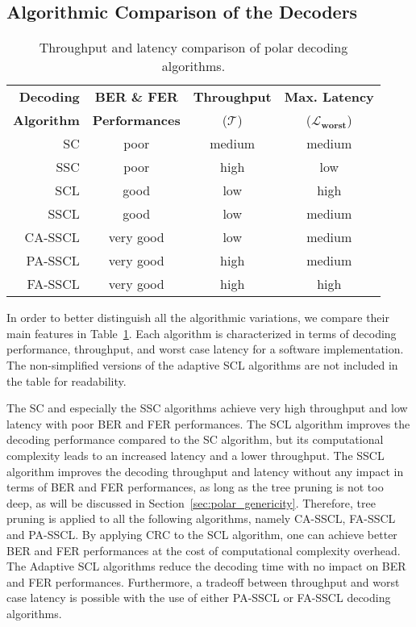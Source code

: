 \subsection{Algorithmic Comparison of the Decoders}

\begin{table}[htp]
  \centering
  \caption{Throughput and latency comparison of polar decoding algorithms.}
  \label{tab:polar_algos}
   \begin{tabular}{r c c c}
    \textbf{Decoding}  & \textbf{BER \& FER}   & \multirow{1}{*}{\textbf{Throughput}} & \textbf{Max. Latency}        \\
    \textbf{Algorithm} & \textbf{Performances} & ($\bm{\mathcal{T}}$)                 & ($\bm{\mathcal{L}_{worst}}$) \\
    \hline
    \hline
    SC      & poor      & medium & medium \\
    SSC     & poor      & high   & low    \\
    SCL     & good      & low    & high   \\
    SSCL    & good      & low    & medium \\
    CA-SSCL & very good & low    & medium \\
    PA-SSCL & very good & high   & medium \\
    FA-SSCL & very good & high   & high   \\
  \end{tabular}
\end{table}

In order to better distinguish all the algorithmic variations, we compare their
main features in Table~\ref{tab:polar_algos}. Each algorithm is characterized in
terms of decoding performance, throughput, and worst case latency for a software
implementation. The non-simplified versions of the adaptive SCL algorithms are
not included in the table for readability.

The SC and especially the SSC algorithms achieve very high throughput and low
latency with poor BER and FER performances. The SCL algorithm improves the
decoding performance compared to the SC algorithm, but its computational
complexity leads to an increased latency and a lower throughput. The SSCL
algorithm improves the decoding throughput and latency without any impact in
terms of BER and FER performances, as long as the tree pruning is not too deep,
as will be discussed in Section~\ref{sec:polar_genericity}. Therefore, tree
pruning is applied to all the following algorithms, namely CA-SSCL, FA-SSCL and
PA-SSCL. By applying CRC to the SCL algorithm, one can achieve better BER and
FER performances at the cost of computational complexity overhead. The Adaptive
SCL algorithms reduce the decoding time with no impact on BER and FER
performances. Furthermore, a tradeoff between throughput and worst case latency
is possible with the use of either PA-SSCL or FA-SSCL decoding algorithms.

